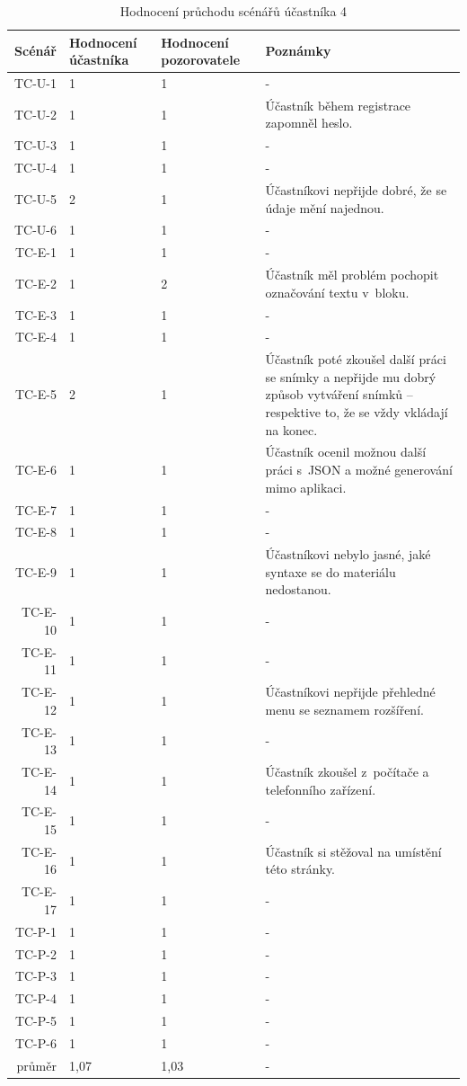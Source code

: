 \begin{longtable}{r|p{2cm}|p{2cm}|p{6cm}}
    \caption{Hodnocení průchodu scénářů účastníka 4}\label{tab:hodnoceniPruchoduUcastnika4}\\
Scénář & Hodnocení účastníka & Hodnocení pozorovatele & Poznámky\\\hline\hline
TC-U-1   & 1 & 1 & - \\\hline
TC-U-2   & 1 & 1 & Účastník během registrace zapomněl heslo. \\\hline
TC-U-3   & 1 & 1 & - \\\hline
TC-U-4   & 1 & 1 & - \\\hline
TC-U-5   & 2 & 1 & Účastníkovi nepřijde dobré, že se údaje mění najednou. \\\hline
TC-U-6   & 1 & 1 & - \\\hline
TC-E-1   & 1 & 1 & - \\\hline
TC-E-2   & 1 & 2 & Účastník měl problém pochopit označování textu v~bloku. \\\hline
TC-E-3   & 1 & 1 & - \\\hline
TC-E-4   & 1 & 1 & - \\\hline
TC-E-5   & 2 & 1 & Účastník poté zkoušel další práci se snímky a nepřijde mu dobrý způsob vytváření snímků -- respektive to, že se vždy vkládají na konec. \\\hline
TC-E-6   & 1 & 1 & Účastník ocenil možnou další práci s~JSON a možné generování mimo aplikaci. \\\hline
TC-E-7   & 1 & 1 & - \\\hline
TC-E-8   & 1 & 1 & - \\\hline
TC-E-9   & 1 & 1 & Účastníkovi nebylo jasné, jaké syntaxe se do materiálu nedostanou. \\\hline
TC-E-10  & 1 & 1 & - \\\hline
TC-E-11  & 1 & 1 & - \\\hline
TC-E-12  & 1 & 1 & Účastníkovi nepřijde přehledné menu se seznamem rozšíření. \\\hline
TC-E-13  & 1 & 1 & - \\\hline
TC-E-14  & 1 & 1 & Účastník zkoušel z~počítače a telefonního zařízení. \\\hline
TC-E-15  & 1 & 1 & - \\\hline
TC-E-16  & 1 & 1 & Účastník si stěžoval na umístění této stránky. \\\hline
TC-E-17  & 1 & 1 & - \\\hline
TC-P-1   & 1 & 1 & - \\\hline
TC-P-2   & 1 & 1 & - \\\hline
TC-P-3   & 1 & 1 & - \\\hline
TC-P-4   & 1 & 1 & - \\\hline
TC-P-5   & 1 & 1 & - \\\hline
TC-P-6   & 1 & 1 & - \\\hline\hline
průměr   & 1,07 & 1,03 & - \\
\end{longtable}


